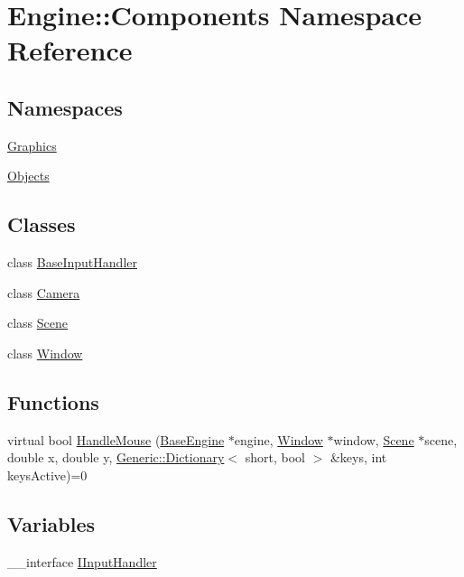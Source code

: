 \hypertarget{namespaceEngine_1_1Components}{}\section{Engine\+:\+:Components Namespace Reference}
\label{namespaceEngine_1_1Components}
\subsection*{Namespaces}
\begin{DoxyCompactItemize}
\item 
 \mbox{\hyperlink{namespaceEngine_1_1Components_1_1Graphics}{Graphics}}
\item 
 \mbox{\hyperlink{namespaceEngine_1_1Components_1_1Objects}{Objects}}
\end{DoxyCompactItemize}
\subsection*{Classes}
\begin{DoxyCompactItemize}
\item 
class \mbox{\hyperlink{classEngine_1_1Components_1_1BaseInputHandler}{Base\+Input\+Handler}}
\item 
class \mbox{\hyperlink{classEngine_1_1Components_1_1Camera}{Camera}}
\item 
class \mbox{\hyperlink{classEngine_1_1Components_1_1Scene}{Scene}}
\item 
class \mbox{\hyperlink{classEngine_1_1Components_1_1Window}{Window}}
\end{DoxyCompactItemize}
\subsection*{Functions}
\begin{DoxyCompactItemize}
\item 
virtual bool \mbox{\hyperlink{namespaceEngine_1_1Components_a9a8cd7405775f5dee0a0944c4019cc93}{Handle\+Mouse}} (\mbox{\hyperlink{classEngine_1_1BaseEngine}{Base\+Engine}} $\ast$engine, \mbox{\hyperlink{classEngine_1_1Components_1_1Window}{Window}} $\ast$window, \mbox{\hyperlink{classEngine_1_1Components_1_1Scene}{Scene}} $\ast$scene, double x, double y, \mbox{\hyperlink{classGeneric_1_1Dictionary}{Generic\+::\+Dictionary}}$<$ short, bool $>$ \&keys, int keys\+Active)=0
\end{DoxyCompactItemize}
\subsection*{Variables}
\begin{DoxyCompactItemize}
\item 
\+\_\+\+\_\+interface \mbox{\hyperlink{namespaceEngine_1_1Components_ac8d3da616707b57e065fd62e6701415f}{I\+Input\+Handler}}
\end{DoxyCompactItemize}


